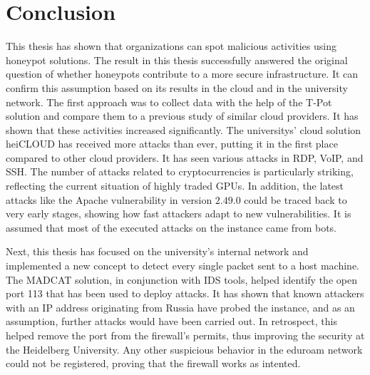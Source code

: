 \chapter{Conclusion}

This thesis has shown that organizations can spot malicious activities using honeypot solutions.
The result in this thesis successfully answered the original question of whether honeypots contribute to a more secure infrastructure.
It can confirm this assumption based on its results in the cloud and in the university network.
The first approach was to collect data with the help of the T-Pot solution and compare them to a previous study of similar cloud providers.
It has shown that these activities increased significantly.
The universitys' cloud solution heiCLOUD has received more attacks than ever, putting it in the first place compared to other cloud providers.
It has seen various attacks in RDP, VoIP, and SSH.
The number of attacks related to cryptocurrencies is particularly striking, reflecting the current situation of highly traded GPUs.
In addition, the latest attacks like the Apache vulnerability in version $2.49.0$ could be traced back to very early stages, showing how fast attackers adapt to new vulnerabilities.
It is assumed that most of the executed attacks on the instance came from bots.

Next, this thesis has focused on the university's internal network and implemented a new concept to detect every single packet sent to a host machine.
The MADCAT solution, in conjunction with IDS tools, helped identify the open port 113 that has been used to deploy attacks.
It has shown that known attackers with an IP address originating from Russia have probed the instance, and as an assumption, further attacks would have been carried out.
In retrospect, this helped remove the port from the firewall's permits, thus improving the security at the Heidelberg University.
Any other suspicious behavior in the eduroam network could not be registered, proving that the firewall works as intented.

